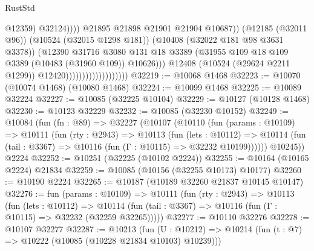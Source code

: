 \begin{lexlean}{RustStd}
\begin{coremodule}
                                                          @12359)
                                                        @32124))))
                                                @21895
                                                @21898
                                                @21901
                                                @21904
                                                @10687))
                                            (@12185 (@32011 @96))
                                            (@10524 (@32015 @1298 @181))
                                            (@10408 (@32022 @181 @98 @3631 @3378))
                                            (@12390
                                              @31716
                                              @3080
                                              @131
                                              @18
                                              @3389
                                              (@31955
                                                @109
                                                @18
                                                @109
                                                @3389
                                                (@10483 (@31960 @109))
                                                @10626)))
                                          @12408
                                          (@10524 (@29624 @2211 @1299))
                                          @12420)))))))))))))))))))
@32219 := @10068 @1468
@32223 := @10070 (@10074 @1468) (@10080 @1468)
@32224 := @10099 @1468
@32225 := @10089 @32224
@32227 := @10085 (@32225 @10104)
@32229 := @10127 (@10128 @1468)
@32230 := @10123 @32229
@32232 := @10085 (@32230 @10152)
@32249 := @10084
    (fun (fn : @89) =>
    @32227
      (@10107
        (@10110
          (fun (params : @10109) =>
          @10111
            (fun (rty : @2943) =>
            @10113
              (fun (lets : @10112) =>
              @10114 (fun (tail : @3367) => @10116 (fun (Γ : @10115) => @32232 @10199))))))
        @10245))
    @2224
@32252 := @10251 (@32225 (@10102 @2224))
@32255 := @10164 (@10165 @2224) @21834
@32259 := @10085 (@10156 (@32255 @10173) @10177)
@32260 := @10190 @2224
@32265 := @10187 (@10189 @32260 @21837 @10145 @10147)
@32276 := fun (params : @10109) =>
  @10111
    (fun (rty : @2943) =>
    @10113
      (fun (lets : @10112) =>
      @10114 (fun (tail : @3367) => @10116 (fun (Γ : @10115) => @32232 (@32259 @32265)))))
@32277 := @10110 @32276
@32278 := @10107 @32277
@32287 := @10213
    (fun (U : @10212) => @10214 (fun (t : @7) => @10222 (@10085 (@10228 @21834 @10103) @10239)))

\end{coremodule}
\end{lexlean}
